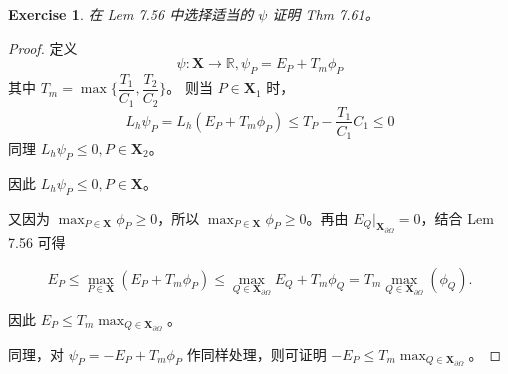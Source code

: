 \documentclass{ctexart}
\newtheorem{ex}{Exercise}
\begin{document}
\begin{ex}
    在 Lem 7.56 中选择适当的 $\psi$ 证明 Thm 7.61。
\end{ex}

\begin{proof}
    定义 
    \begin{equation}
        \psi : \mathbf{X} \rightarrow \mathbb{R}, \psi_P = E_P + T_m\phi_P
    \end{equation}
    其中 $T_m = \max\{\dfrac{T_1}{C_1}, \dfrac{T_2}{C_2}\}$。
    则当 $P\in \mathbf{X}_1$ 时，
    \begin{equation}
        L_h\psi_P = L_h(E_P + T_m\phi_P) \leq T_P - \dfrac{T_1}{C_1} C_1 \leq 0
    \end{equation}
    同理 $L_h\psi_P \leq 0, P\in \mathbf{X}_2$。
    
    因此 $L_h\psi_P \leq 0, P\in \mathbf{X}$。

    又因为 $\max_{P\in \mathbf{X}}\phi_P\geq 0$，所以 $\max_{P\in \mathbf{X}} \phi_P \geq 0$。再由 $E_Q|_{\mathbf{X}_{\partial\Omega}} = 0$，结合 Lem 7.56 可得

    \begin{equation}
        E_P\leq \max_{P\in \mathbf{X}}(E_P + T_m\phi_P)\leq \max_{Q\in \mathbf{X}_{\partial\Omega}}{E_Q + T_m\phi_Q} = T_m\max_{Q\in \mathbf{X}_{\partial\Omega}}(\phi_Q).
    \end{equation}

    因此 $E_P\leq T_m\max_{Q\in \mathbf{X}_{\partial\Omega}}$。

    同理，对 $\psi_P = -E_P + T_m\phi_P$ 作同样处理，则可证明 $-E_P\leq T_m\max_{Q\in \mathbf{X}_{\partial\Omega}}$。
\end{proof}
\end{document}
